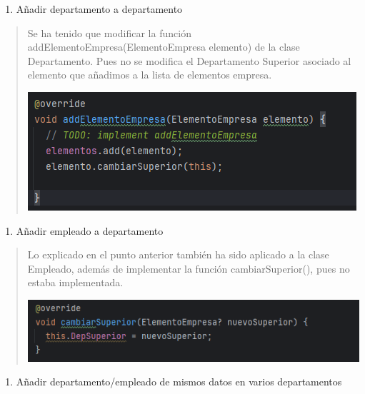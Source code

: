 \documentclass[openany]{article}
\begin{document}
\begin{enumerate}
\def\labelenumi{\arabic{enumi}.}
\item
  Añadir departamento a departamento
\end{enumerate}

\begin{quote}
Se ha tenido que modificar la función addElementoEmpresa(ElementoEmpresa
elemento) de la clase Departamento. Pues no se modifica el Departamento
Superior asociado al elemento que añadimos a la lista de elementos
empresa.

\includegraphics{imagenes/test2.png}
\end{quote}

\begin{enumerate}
\def\labelenumi{\arabic{enumi}.}
\setcounter{enumi}{1}
\item
  Añadir empleado a departamento
\end{enumerate}

\begin{quote}
Lo explicado en el punto anterior también ha sido aplicado a la clase
Empleado, además de implementar la función cambiarSuperior(), pues no
estaba implementada.

\includegraphics{imagenes/test6.png}
\end{quote}

\begin{enumerate}
\def\labelenumi{\arabic{enumi}.}
\setcounter{enumi}{2}
\item
  Añadir departamento/empleado de mismos datos en varios departamentos
\end{enumerate}
\end{document}
